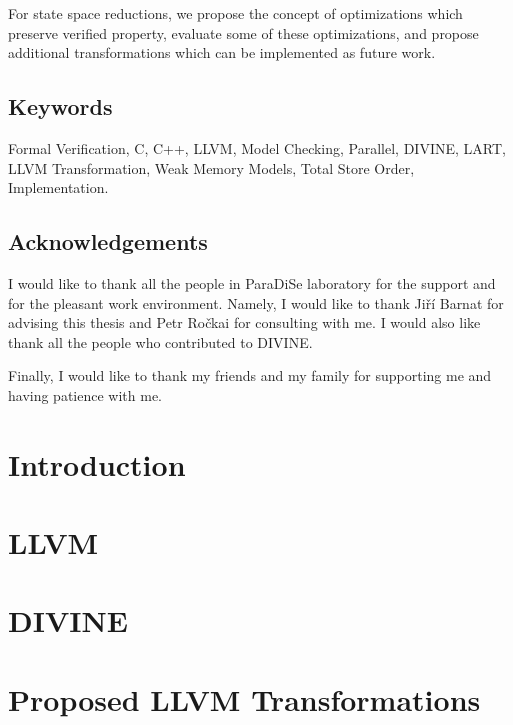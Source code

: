 \documentclass[11pt,twoside,a4paper]{book}
\newcommand{\divine}{\mbox{\textsf{DIVINE}}\xspace}
\newcommand{\lart}{\mbox{\textsf{LART}}\xspace}
\newcommand{\paradise}{ParaDiSe\xspace}
\newcommand{\llvm}{\textsf{LLVM}\xspace}
\begin{document}
For state space reductions, we propose the concept of optimizations which
preserve verified property, evaluate some of these optimizations, and propose
additional transformations which can be implemented as future work.

\section*{Keywords}
Formal Verification, C, C++, \llvm, Model Checking, Parallel,
\divine, \lart, \llvm Transformation, Weak Memory Models, Total Store Order,
Implementation.

\cleardoublepage

\section*{Acknowledgements}
I would like to thank all the people in \paradise laboratory for the support and
for the pleasant work environment. Namely, I would like to thank Jiří Barnat for
advising this thesis and Petr Ročkai for consulting with me. I would also like
thank all the people who contributed to \divine.

Finally, I would like to thank my friends and my family for supporting me and
having patience with me.

\cleardoublepage
\thispagestyle{empty}

\pagestyle{headings}
\tableofcontents %
\mainmatter

\chapter{Introduction}\label{chap:introduction}


\chapter{\llvm} \label{chap:llvm}


\chapter{\divine} \label{chap:divine}


\chapter{Proposed \llvm Transformations} \label{chap:trans}

\end{document}

